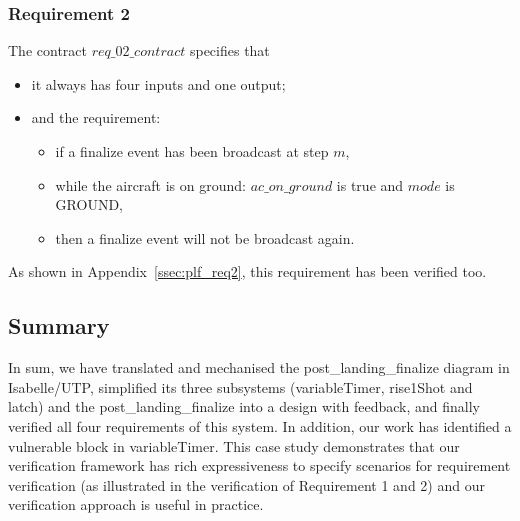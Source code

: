 \subsubsection{Requirement 2}
The contract $req\_02\_contract$ specifies that 
\begin{itemize}
  \item it always has four inputs and one output;
  \item and the requirement: 
     \begin{itemize}
        \item if a finalize event has been broadcast at step $m$,
        \item while the aircraft is on ground: $ac\_on\_ground$ is true and $mode$ is GROUND,
        \item then a finalize event will not be broadcast again.
     \end{itemize}
\end{itemize}

As shown in Appendix~\ref{ssec:plf_req2}, this requirement has been verified too.

\subsection{Summary}
In sum, we have translated and mechanised the \textsf{post\_landing\_finalize} diagram in Isabelle/UTP, simplified its three subsystems (\textsf{variableTimer}, \textsf{rise1Shot} and \textsf{latch}) and the \textsf{post\_landing\_finalize} into a design with feedback, and finally verified all four requirements of this system. In addition, our work has identified a vulnerable block in \textsf{variableTimer}. This case study demonstrates that our verification framework has rich expressiveness to specify scenarios for requirement verification (as illustrated in the verification of Requirement 1 and 2) and our verification approach is useful in practice.
